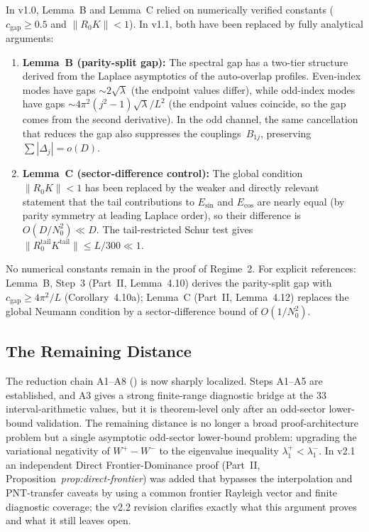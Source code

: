 \documentclass[12pt,a4paper]{article}
\theoremstyle{definition}
\theoremstyle{remark}
\begin{document}
In v1.0, Lemma~B and Lemma~C relied on numerically verified constants ($c_{\mathrm{gap}} \geq 0.5$ and $\|R_0 K\| < 1$). In v1.1, both have been replaced by fully analytical arguments:
\begin{enumerate}
  \item \textbf{Lemma~B (parity-split gap):} The spectral gap has a two-tier structure derived from the Laplace asymptotics of the auto-overlap profiles. Even-index modes have gaps $\sim 2\sqrt{\lambda}$ (the endpoint values differ), while odd-index modes have gaps $\sim 4\pi^2(j^2-1)\sqrt{\lambda}/L^2$ (the endpoint values coincide, so the gap comes from the second derivative). In the odd channel, the same cancellation that reduces the gap also suppresses the couplings~$B_{1j}$, preserving $\sum |\Delta_j| = o(D)$.
  \item \textbf{Lemma~C (sector-difference control):} The global condition $\|R_0 K\| < 1$ has been replaced by the weaker and directly relevant statement that the tail contributions to $E_{\sin}$ and $E_{\cos}$ are nearly equal (by parity symmetry at leading Laplace order), so their difference is $O(D/N_0^2) \ll D$. The tail-restricted Schur test gives $\|R_0^{\mathrm{tail}} K^{\mathrm{tail}}\| \leq L/300 \ll 1$.
\end{enumerate}
No numerical constants remain in the proof of Regime~2. For explicit references: Lemma~B, Step~3 (Part~II, Lemma~4.10) derives the parity-split gap with $c_{\mathrm{gap}} \geq 4\pi^2/L$ (Corollary~4.10a); Lemma~C (Part~II, Lemma~4.12) replaces the global Neumann condition by a sector-difference bound of $O(1/N_0^2)$.

\subsection{The Remaining Distance}

The reduction chain A1--A8 () is now sharply
localized. Steps A1--A5 are established, and A3 gives a strong
finite-range diagnostic bridge at the $33$ interval-arithmetic values, but it
is theorem-level only after an odd-sector lower-bound validation. The remaining distance is no
longer a broad proof-architecture problem but a single asymptotic odd-sector
lower-bound problem: upgrading the variational negativity of $W^+-W^-$ to the
eigenvalue inequality $\lambda_1^+<\lambda_1^-$. In v2.1 an independent
Direct Frontier-Dominance proof (Part~II, Proposition~\emph{prop:direct-frontier})
was added that bypasses the interpolation and PNT-transfer caveats by using a
common frontier Rayleigh vector and finite diagnostic coverage; the v2.2 revision
clarifies exactly what this argument proves and what it still leaves open.
\end{document}
